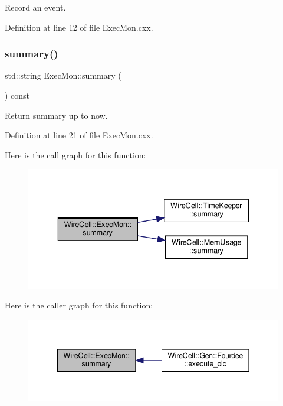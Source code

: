 Record an event. 



Definition at line 12 of file Exec\+Mon.\+cxx.

\mbox{\label{class_wire_cell_1_1_exec_mon_ab46d26801f07ff9da1df0fa4c531a97c}} 
\subsubsection{\texorpdfstring{summary()}{summary()}}
{\footnotesize\ttfamily std\+::string Exec\+Mon\+::summary (\begin{DoxyParamCaption}{ }\end{DoxyParamCaption}) const}



Return summary up to now. 



Definition at line 21 of file Exec\+Mon.\+cxx.

Here is the call graph for this function\+:
\nopagebreak
\begin{figure}[H]
\begin{center}
\leavevmode
\includegraphics[width=336pt]{class_wire_cell_1_1_exec_mon_ab46d26801f07ff9da1df0fa4c531a97c_cgraph}
\end{center}
\end{figure}
Here is the caller graph for this function\+:
\nopagebreak
\begin{figure}[H]
\begin{center}
\leavevmode
\includegraphics[width=342pt]{class_wire_cell_1_1_exec_mon_ab46d26801f07ff9da1df0fa4c531a97c_icgraph}
\end{center}
\end{figure}


